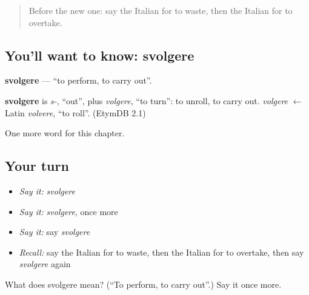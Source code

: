 \label{lesson:IT-C240-svolgere}



\begin{quote}
Before the new one: say the Italian for to waste, then the Italian for to overtake.
\end{quote}

\subsection*{You'll want to know: svolgere}
\textbf{svolgere} — \textquotedblleft{}to perform, to carry out\textquotedblright{}.

\begin{cousinweb}
\textbf{svolgere} is \emph{s-}, \textquotedblleft{}out\textquotedblright{}, plus \emph{volgere}, \textquotedblleft{}to turn\textquotedblright{}: to unroll, to carry out. \emph{volgere} $\leftarrow$ Latin \emph{volvere}, \textquotedblleft{}to roll\textquotedblright{}. (EtymDB 2.1)
\end{cousinweb}

\begin{grammarlens}[title={What you've built}]
One more word for this chapter.
\end{grammarlens}

\subsection*{Your turn}
\begin{itemize}
\raggedright
  \item \emph{Say it:} \emph{svolgere}
  \item \emph{Say it:} \emph{svolgere}, once more
  \item \emph{Say it:} say \emph{svolgere}
  \item \emph{Recall:} say the Italian for to waste, then the Italian for to overtake, then say \emph{svolgere} again
\end{itemize}

\begin{tcolorbox}[breakable,colback=teal!4,colframe=teal!35!black,title={Before you move on}]
What does svolgere mean? (\textquotedblleft{}To perform, to carry out\textquotedblright{}.) Say it once more.
\end{tcolorbox}
